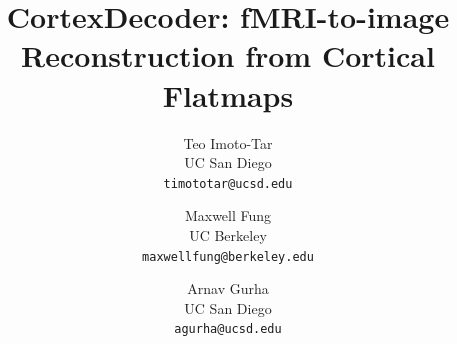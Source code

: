 \documentclass[10pt,twocolumn,letterpaper]{article}
\title{CortexDecoder: fMRI-to-image Reconstruction from Cortical Flatmaps}
\author{Teo Imoto-Tar\\
UC San Diego\\
{\tt\small timototar@ucsd.edu}
\and
Maxwell Fung\\
UC Berkeley\\
{\tt\small maxwellfung@berkeley.edu} \\
\and
Arnav Gurha \\
UC San Diego \\
{\tt\small agurha@ucsd.edu}
}
\begin{document}
\maketitle








{
    \small
    
    
}
\end{document}
